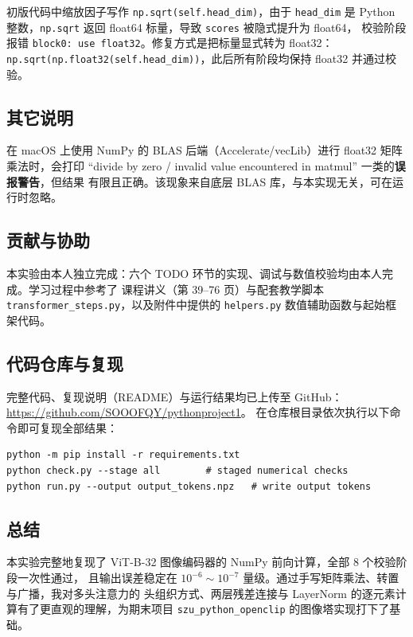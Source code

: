 \documentclass[a4paper,12pt]{article}
\begin{document}
初版代码中缩放因子写作 \texttt{np.sqrt(self.head\_dim)}，由于 \texttt{head\_dim} 是 Python
整数，\texttt{np.sqrt} 返回 float64 标量，导致 \texttt{scores} 被隐式提升为 float64，
校验阶段报错 \texttt{block0: use float32}。修复方式是把标量显式转为 float32：
\texttt{np.sqrt(np.float32(self.head\_dim))}，此后所有阶段均保持 float32 并通过校验。

\subsection{其它说明}

在 macOS 上使用 NumPy 的 BLAS 后端（Accelerate/vecLib）进行 float32 矩阵乘法时，会打印
``divide by zero / invalid value encountered in matmul'' 一类的\textbf{误报警告}，但结果
有限且正确。该现象来自底层 BLAS 库，与本实现无关，可在运行时忽略。

\subsection{贡献与协助}

本实验由本人独立完成：六个 TODO 环节的实现、调试与数值校验均由本人完成。学习过程中参考了
课程讲义（第 39--76 页）与配套教学脚本 \texttt{transformer\_steps.py}，以及附件中提供的
\texttt{helpers.py} 数值辅助函数与起始框架代码。

\subsection{代码仓库与复现}

完整代码、复现说明（README）与运行结果均已上传至 GitHub：
\url{https://github.com/SOOOFQY/pythonproject1}。
在仓库根目录依次执行以下命令即可复现全部结果：

\begin{lstlisting}
python -m pip install -r requirements.txt
python check.py --stage all        # staged numerical checks
python run.py --output output_tokens.npz   # write output tokens
\end{lstlisting}

\subsection{总结}

本实验完整地复现了 ViT-B-32 图像编码器的 NumPy 前向计算，全部 8 个校验阶段一次性通过，
且输出误差稳定在 $10^{-6}\sim10^{-7}$ 量级。通过手写矩阵乘法、转置与广播，我对多头注意力的
头组织方式、两层残差连接与 LayerNorm 的逐元素计算有了更直观的理解，为期末项目
\texttt{szu\_python\_openclip} 的图像塔实现打下了基础。
\end{document}
